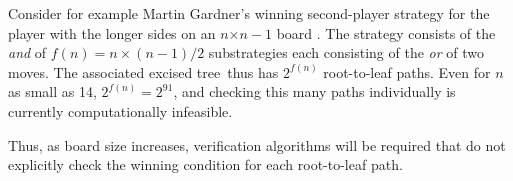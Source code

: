 \documentclass{llncs}
\def\exct{excised tree}
\begin{document}
Consider for example Martin Gardner's winning second-player strategy 
for the player with the longer sides on an $n$$\times$$n-1$ board \cite{Gardner59}.
The strategy consists of the {\it and} of $f(n)=n\times(n-1)/2$
substrategies each consisting of the {\it or} of two moves.
The associated \exct\ thus has $2^{f(n)}$ root-to-leaf paths.
Even for $n$ as small as 14, $2^{f(n)}=2^{91}$, and
checking this many paths individually is currently computationally infeasible.

Thus, as board size increases, 
verification algorithms will be required that do not explicitly
check the winning condition for each root-to-leaf path.




\end{document}
